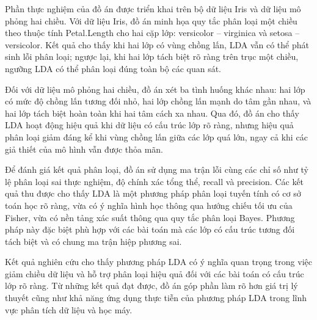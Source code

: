 \documentclass[12pt,a4paper,oneside]{report}
\begin{document}
Phần thực nghiệm của đồ án được triển khai trên bộ dữ liệu Iris và dữ liệu mô phỏng hai chiều. Với dữ liệu Iris, đồ án minh họa quy tắc phân loại một chiều theo thuộc tính Petal.Length cho hai cặp lớp: versicolor – virginica và setosa – versicolor. Kết quả cho thấy khi hai lớp có vùng chồng lấn, LDA vẫn có thể phát sinh lỗi phân loại; ngược lại, khi hai lớp tách biệt rõ ràng trên trục một chiều, ngưỡng LDA có thể phân loại đúng toàn bộ các quan sát.

Đối với dữ liệu mô phỏng hai chiều, đồ án xét ba tình huống khác nhau: hai lớp có mức độ chồng lấn tương đối nhỏ, hai lớp chồng lấn mạnh do tâm gần nhau, và hai lớp tách biệt hoàn toàn khi hai tâm cách xa nhau. Qua đó, đồ án cho thấy LDA hoạt động hiệu quả khi dữ liệu có cấu trúc lớp rõ ràng, nhưng hiệu quả phân loại giảm đáng kể khi vùng chồng lấn giữa các lớp quá lớn, ngay cả khi các giả thiết của mô hình vẫn được thỏa mãn.

Để đánh giá kết quả phân loại, đồ án sử dụng ma trận lỗi cùng các chỉ số như tỷ lệ phân loại sai thực nghiệm, độ chính xác tổng thể, recall và precision. Các kết quả thu được cho thấy LDA là một phương pháp phân loại tuyến tính có cơ sở toán học rõ ràng, vừa có ý nghĩa hình học thông qua hướng chiếu tối ưu của Fisher, vừa có nền tảng xác suất thông qua quy tắc phân loại Bayes. Phương pháp này đặc biệt phù hợp với các bài toán mà các lớp có cấu trúc tương đối tách biệt và có chung ma trận hiệp phương sai.

Kết quả nghiên cứu cho thấy phương pháp LDA có ý nghĩa quan trọng trong việc giảm chiều dữ liệu và hỗ trợ phân loại hiệu quả đối với các bài toán có cấu trúc lớp rõ ràng. Từ những kết quả đạt được, đồ án góp phần làm rõ hơn giá trị lý thuyết cũng như khả năng ứng dụng thực tiễn của phương pháp LDA trong lĩnh vực phân tích dữ liệu và học máy.

\clearpage
{}
\setcounter{page}{1}




\end{document}
